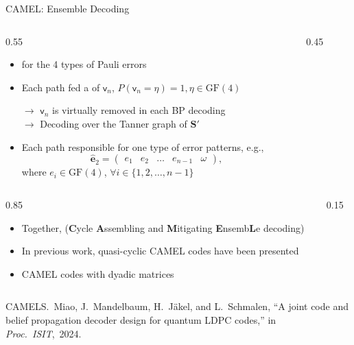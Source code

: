 \documentclass[10pt, aspectratio=169]{beamer}
\begin{document}
\begin{frame}[c]{CAMEL: Ensemble Decoding}
	\begin{columns}
		\begin{column}{0.55\textwidth}
			\begin{itemize}
				\item {} for the 4 types of Pauli errors
				
				\item Each path fed a  of $\mathsf{v}_n$, $P(\mathsf{v}_n = \eta)=1, \eta \in \mathrm{GF}(4)$
				
				 $\rightarrow$ $\mathsf{v}_n$ is virtually removed in each BP decoding\\
				 
				 $\rightarrow$ Decoding over the Tanner graph of $\bm{S}'$
				
				\item Each path responsible for one type of error patterns, e.g., 
				\[\hat{\bm{e}}_2 = \begin{pmatrix}
					e_1&e_2&\ldots& e_{n-1}&\omega
				\end{pmatrix},\] 
				where $e_i\in \mathrm{GF}(4)$, $ \forall i \in \{1,2,\ldots, n-1\}$
			\end{itemize}
		
		\end{column}
		\begin{column}{0.45\textwidth}
			
		\end{column}
	\end{columns}

	\begin{columns}
	\begin{column}{0.85\textwidth}

		\begin{itemize}
			\item Together,  (\textbf{C}ycle \textbf{A}ssembling and \textbf{M}itigating \textbf{E}nsemb\textbf{L}e decoding)
                            \bigskip
                            \pause
                \item In previous work, quasi-cyclic CAMEL codes have been presented~
                \item {} CAMEL codes with dyadic matrices
		\end{itemize}
		
	\end{column}
	\begin{column}{0.15\textwidth}
		
	\end{column}
\end{columns}

    \vspace{1em}
    
    \addreferences
    {CAMEL}{S.~Miao, J.~Mandelbaum, H.~J\"akel, and L.~Schmalen, ``A joint code and belief propagation decoder design for quantum {LDPC} codes,'' in \emph{Proc.~ISIT},~2024.}
    \endreferences
\end{frame}
\end{document}
